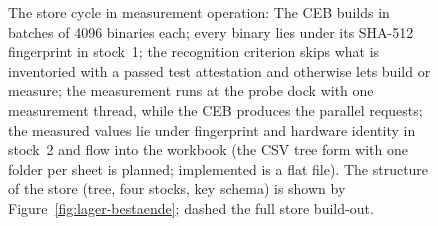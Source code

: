 \begin{nurkurz}
\begin{figure}[htbp]
\caption{The store cycle in measurement operation: The CEB builds in batches of 4096 binaries each;
every binary lies under its SHA-512 fingerprint in stock~1; the recognition criterion skips what is
inventoried with a passed test attestation and otherwise lets build or measure; the measurement runs
at the probe dock with one measurement thread, while the CEB produces the parallel requests; the
measured values lie under fingerprint and hardware identity in stock~2 and flow into the workbook
(the CSV tree form with one folder per sheet is planned; implemented is a flat file). The structure
of the store (tree, four stocks, key schema) is shown by Figure~\ref{fig:lager-bestaende}; dashed the
full store build-out.}\label{fig:eval-lager-kreislauf}
\end{figure}
\end{nurkurz}

